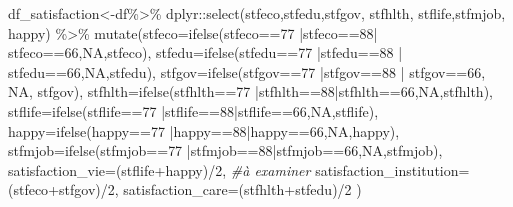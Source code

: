 \documentclass[
]{book}
\newenvironment{Shaded}{\begin{snugshade}}{\end{snugshade}}
\newcommand{\AttributeTok}[1]{\textcolor[rgb]{0.77,0.63,0.00}{#1}}
\newcommand{\CommentTok}[1]{\textcolor[rgb]{0.56,0.35,0.01}{\textit{#1}}}
\newcommand{\ConstantTok}[1]{\textcolor[rgb]{0.00,0.00,0.00}{#1}}
\newcommand{\DecValTok}[1]{\textcolor[rgb]{0.00,0.00,0.81}{#1}}
\newcommand{\FunctionTok}[1]{\textcolor[rgb]{0.00,0.00,0.00}{#1}}
\newcommand{\NormalTok}[1]{#1}
\newcommand{\OtherTok}[1]{\textcolor[rgb]{0.56,0.35,0.01}{#1}}
\newcommand{\SpecialCharTok}[1]{\textcolor[rgb]{0.00,0.00,0.00}{#1}}
\begin{document}
\begin{Shaded}
\begin{Highlighting}[]
 
\NormalTok{df\_satisfaction}\OtherTok{\textless{}{-}}\NormalTok{df}\SpecialCharTok{\%\textgreater{}\%}
\NormalTok{  dplyr}\SpecialCharTok{::}\FunctionTok{select}\NormalTok{(stfeco,stfedu,stfgov, stfhlth, stflife,stfmjob, happy) }\SpecialCharTok{\%\textgreater{}\%}
  \FunctionTok{mutate}\NormalTok{(}\AttributeTok{stfeco=}\FunctionTok{ifelse}\NormalTok{(stfeco}\SpecialCharTok{==}\DecValTok{77} \SpecialCharTok{|}\NormalTok{stfeco}\SpecialCharTok{==}\DecValTok{88}\SpecialCharTok{|}\NormalTok{ stfeco}\SpecialCharTok{==}\DecValTok{66}\NormalTok{,}\ConstantTok{NA}\NormalTok{,stfeco),}
         \AttributeTok{stfedu=}\FunctionTok{ifelse}\NormalTok{(stfedu}\SpecialCharTok{==}\DecValTok{77} \SpecialCharTok{|}\NormalTok{stfedu}\SpecialCharTok{==}\DecValTok{88} \SpecialCharTok{|}\NormalTok{ stfedu}\SpecialCharTok{==}\DecValTok{66}\NormalTok{,}\ConstantTok{NA}\NormalTok{,stfedu),}
         \AttributeTok{stfgov=}\FunctionTok{ifelse}\NormalTok{(stfgov}\SpecialCharTok{==}\DecValTok{77} \SpecialCharTok{|}\NormalTok{stfgov}\SpecialCharTok{==}\DecValTok{88} \SpecialCharTok{|}\NormalTok{ stfgov}\SpecialCharTok{==}\DecValTok{66}\NormalTok{, }\ConstantTok{NA}\NormalTok{, stfgov), }
         \AttributeTok{stfhlth=}\FunctionTok{ifelse}\NormalTok{(stfhlth}\SpecialCharTok{==}\DecValTok{77} \SpecialCharTok{|}\NormalTok{stfhlth}\SpecialCharTok{==}\DecValTok{88}\SpecialCharTok{|}\NormalTok{stfhlth}\SpecialCharTok{==}\DecValTok{66}\NormalTok{,}\ConstantTok{NA}\NormalTok{,stfhlth), }
         \AttributeTok{stflife=}\FunctionTok{ifelse}\NormalTok{(stflife}\SpecialCharTok{==}\DecValTok{77} \SpecialCharTok{|}\NormalTok{stflife}\SpecialCharTok{==}\DecValTok{88}\SpecialCharTok{|}\NormalTok{stflife}\SpecialCharTok{==}\DecValTok{66}\NormalTok{,}\ConstantTok{NA}\NormalTok{,stflife),}
         \AttributeTok{happy=}\FunctionTok{ifelse}\NormalTok{(happy}\SpecialCharTok{==}\DecValTok{77} \SpecialCharTok{|}\NormalTok{happy}\SpecialCharTok{==}\DecValTok{88}\SpecialCharTok{|}\NormalTok{happy}\SpecialCharTok{==}\DecValTok{66}\NormalTok{,}\ConstantTok{NA}\NormalTok{,happy),}
         \AttributeTok{stfmjob=}\FunctionTok{ifelse}\NormalTok{(stfmjob}\SpecialCharTok{==}\DecValTok{77} \SpecialCharTok{|}\NormalTok{stfmjob}\SpecialCharTok{==}\DecValTok{88}\SpecialCharTok{|}\NormalTok{stfmjob}\SpecialCharTok{==}\DecValTok{66}\NormalTok{,}\ConstantTok{NA}\NormalTok{,stfmjob),}
         \AttributeTok{satisfaction\_vie=}\NormalTok{(stflife}\SpecialCharTok{+}\NormalTok{happy)}\SpecialCharTok{/}\DecValTok{2}\NormalTok{, }\CommentTok{\#à examiner}
         \AttributeTok{satisfaction\_institution=}\NormalTok{(stfeco}\SpecialCharTok{+}\NormalTok{stfgov)}\SpecialCharTok{/}\DecValTok{2}\NormalTok{,}
         \AttributeTok{satisfaction\_care=}\NormalTok{(stfhlth}\SpecialCharTok{+}\NormalTok{stfedu)}\SpecialCharTok{/}\DecValTok{2}
\NormalTok{)}


\end{Highlighting}
\end{Shaded}
\end{document}
